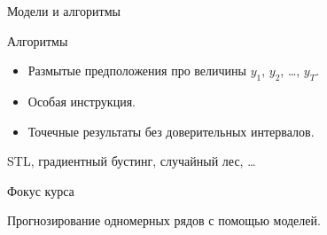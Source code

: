 \begin{frame}{Модели и алгоритмы}

\begin{block}{Алгоритмы}
  \begin{itemize}[<+->]
    \item Размытые предположения про величины $y_1$, $y_2$, \ldots, $y_T$.
    \item Особая инструкция.
    \item Точечные результаты без доверительных интервалов. 
  \end{itemize}
\end{block}
  
STL, градиентный бустинг, случайный лес, \ldots

\end{frame}

\begin{frame}{Фокус курса}

Прогнозирование одномерных рядов с помощью моделей. 

\end{frame}



